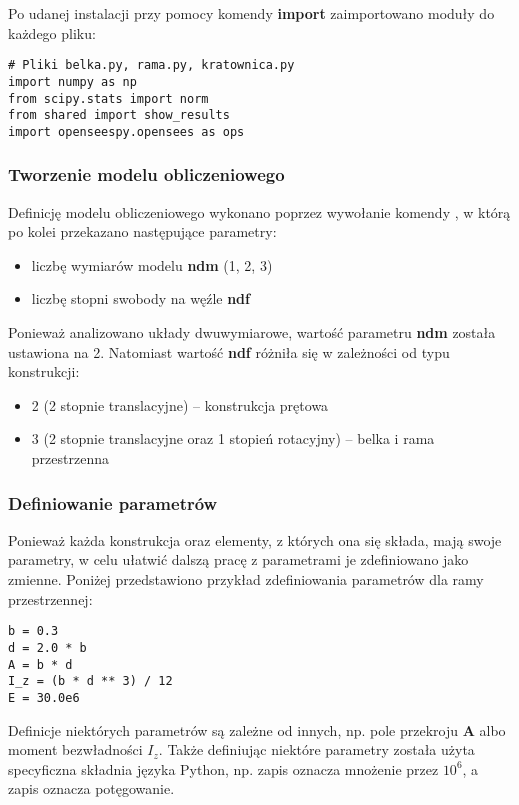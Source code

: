 Po udanej instalacji przy pomocy komendy \textbf{import} zaimportowano moduły do każdego pliku:

\begin{lstlisting}
# Pliki belka.py, rama.py, kratownica.py
import numpy as np
from scipy.stats import norm
from shared import show_results
import openseespy.opensees as ops
\end{lstlisting}

\subsubsection{Tworzenie modelu obliczeniowego}

Definicję modelu obliczeniowego wykonano poprzez wywołanie komendy
, w którą po kolei przekazano następujące parametry:

\begin{itemize}
    \item liczbę wymiarów modelu \textbf{ndm} (1, 2, 3)
    \item liczbę stopni swobody na węźle \textbf{ndf}
\end{itemize}

Ponieważ analizowano układy dwuwymiarowe, wartość parametru \textbf{ndm} została ustawiona na 2.
Natomiast wartość \textbf{ndf} różniła się w zależności od typu konstrukcji:

\begin{itemize}
    \item 2 (2 stopnie translacyjne) – konstrukcja prętowa
    \item 3 (2 stopnie translacyjne oraz 1 stopień rotacyjny) – belka i rama przestrzenna
\end{itemize}

\subsubsection{Definiowanie parametrów}

Ponieważ każda konstrukcja oraz elementy, z których ona się składa, mają swoje parametry, w celu ułatwić dalszą pracę z parametrami
je zdefiniowano jako zmienne.
Poniżej przedstawiono przykład zdefiniowania parametrów dla ramy przestrzennej:

\begin{lstlisting}
b = 0.3
d = 2.0 * b
A = b * d
I_z = (b * d ** 3) / 12
E = 30.0e6
\end{lstlisting}

Definicje niektórych parametrów są zależne od innych, np. pole przekroju \textbf{A} albo moment bezwładności \textbf{$I_z$}.
Także definiując niektóre parametry została użyta specyficzna składnia języka Python, np. zapis  oznacza mnożenie
przez \textbf{$10^6$}, a zapis \ilc{**} oznacza potęgowanie.

